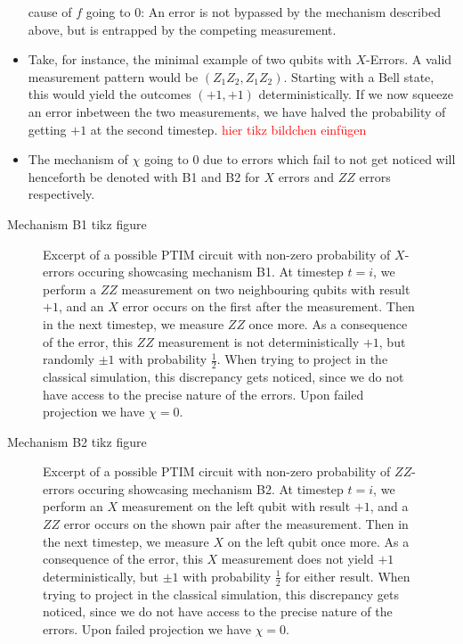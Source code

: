 \begin{itemize}
    cause of $f$ going to $0$: An error is not bypassed by the mechanism
    described above, but is entrapped by the competing measurement.
  \item Take, for instance, the minimal example of two qubits with $X$-Errors.
    A valid measurement pattern would be $(Z_1Z_2, Z_1Z_2)$. Starting with a
    Bell state, this would yield the outcomes $(+1, +1)$ deterministically. If
    we now squeeze an error inbetween the two measurements, we have halved the
    probability of getting $+1$ at the second timestep. \textcolor{red}{hier
    tikz bildchen einf\"ugen}
    \item The mechanism of $\chi$ going to $0$ due to errors which fail to not 
    get noticed will henceforth be denoted with \textsf{B1} and \textsf{B2} for
    $X$ errors and $ZZ$ errors respectively.
\end{itemize}

Mechanism \textsf{B1} tikz figure
\begin{figure}[t]
  \centering
  
  \caption{Excerpt of a possible PTIM circuit with non-zero probability of
  $X$-errors occuring showcasing mechanism \textsf{B1}. At timestep $t=i$, 
  we perform a $ZZ$ measurement on two neighbouring qubits with result $+1$,
  and an $X$ error occurs on the first after the measurement. Then in the next
  timestep, we measure $ZZ$ once more. As a consequence of the error, this $ZZ$
  measurement is not deterministically $+1$, but randomly $\pm 1$ with
  probability $\frac{1}{2}$. When trying to project in the classical
  simulation, this discrepancy gets noticed, since we do not have access to the
  precise nature of the errors. Upon failed projection we have $\chi=0$.}
  \label{fig:mech-b1-lxe}
\end{figure}

Mechanism \textsf{B2} tikz figure
\begin{figure}[t]
  \centering
  
  \caption{Excerpt of a possible PTIM circuit with non-zero probability of
  $ZZ$-errors occuring showcasing mechanism \textsf{B2}. At timestep $t=i$, 
  we perform an $X$ measurement on the left qubit with result $+1$,
  and a $ZZ$ error occurs on the shown pair after the measurement. Then in the next
  timestep, we measure $X$ on the left qubit once more. As a consequence of the
  error, this $X$
  measurement does not yield $+1$ deterministically, but $\pm 1$ with
  probability $\frac{1}{2}$ for either result. When trying to project in the classical
  simulation, this discrepancy gets noticed, since we do not have access to the
  precise nature of the errors. Upon failed projection we have $\chi=0$.}
  \label{fig:mech-b2-lxe}
\end{figure}

